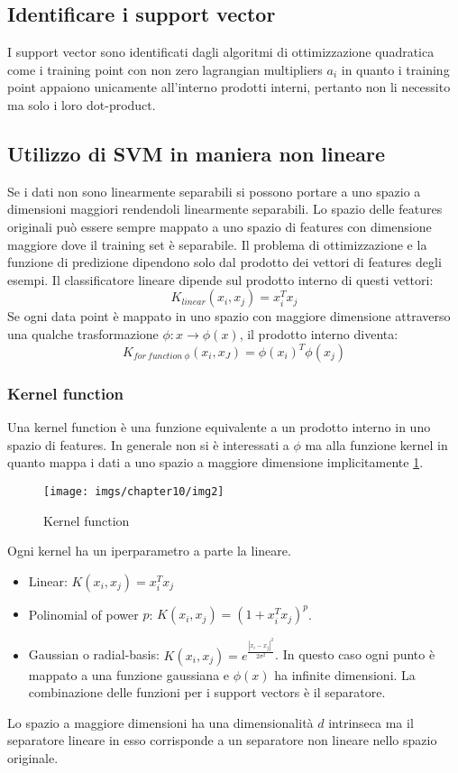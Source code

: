 	\subsection{Identificare i support vector}
	I support vector sono identificati dagli algoritmi di ottimizzazione quadratica come i training point con non zero lagrangian multipliers $a_i$ in quanto i training point appaiono unicamente all'interno prodotti interni, pertanto non li necessito ma solo i loro dot-product.
	
	\subsection{Utilizzo di SVM in maniera non lineare}
	Se i dati non sono linearmente separabili si possono portare a uno spazio a dimensioni maggiori rendendoli linearmente separabili.
	Lo spazio delle features originali pu\`o essere sempre mappato a uno spazio di features con dimensione maggiore dove il training set \`e separabile.
	Il problema di ottimizzazione e la funzione di predizione dipendono solo dal prodotto dei vettori di features degli esempi.
	Il classificatore lineare dipende sul prodotto interno di questi vettori:
	$$K_{linear}(x_i,x_j) = x_i^Tx_j$$
	Se ogni data point \`e mappato in uno spazio con maggiore dimensione attraverso una qualche trasformazione $\phi:x\rightarrow\phi(x)$, il prodotto interno diventa:
	$$K_{for\ function\ \phi}(x_i,x_J)= \phi(x_i)^T\phi(x_j)$$

		\subsubsection{Kernel function}
		Una kernel function \`e una funzione equivalente a un prodotto interno in uno spazio di features.
		In generale non si \`e interessati a $\phi$ ma alla funzione kernel in quanto mappa i dati a uno spazio a maggiore dimensione implicitamente \ref{fig:chapter10-02}.
		
		\begin{figure}
			\centering
			\texttt{[image: imgs/chapter10/img2]}
			\caption{Kernel function}
			\label{fig:chapter10-02}
		\end{figure}
		
		Ogni kernel ha un iperparametro a parte la lineare.
		\begin{itemize}
			\item Linear: $K(x_i,x_j) = x_i^Tx_j$
			\item Polinomial of power $p$: $K(x_i, x_j) = (1+x_i^Tx_j)^p$.
			\item Gaussian o radial-basis: $K(x_i, x_j) = e^{\frac{|x_i - x_j|^2}{2\sigma^2}}$.
			In questo caso ogni punto \`e mappato a una funzione gaussiana e $\phi(x)$ ha infinite dimensioni.
			La combinazione delle funzioni per i support vectors \`e il separatore.
		\end{itemize}
		Lo spazio a maggiore dimensioni ha una dimensionalit\`a $d$ intrinseca ma il separatore lineare in esso corrisponde a un separatore non lineare nello spazio originale.
		
